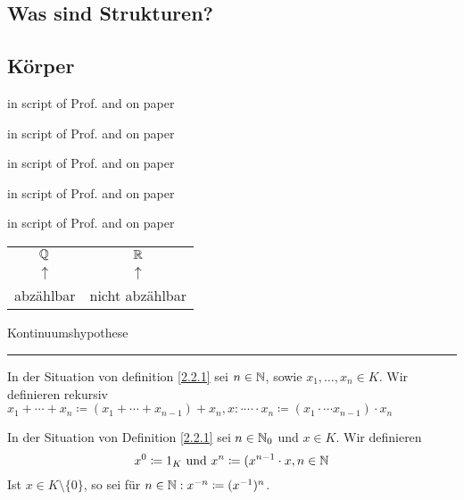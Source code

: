 \documentclass[consecutivenumbering]{gadsescript}
\begin{document}
\subsection{Was sind Strukturen?}
\subsection{Körper}
\begin{subdefinition}[Körper]
	in script of Prof. and on paper
\end{subdefinition}
\begin{subexample}
	in script of Prof. and on paper
\end{subexample}
\begin{subexample}
	in script of Prof. and on paper
\end{subexample}
\begin{sublemma}
	in script of Prof. and on paper
\end{sublemma}
\begin{sublemma}
	in script of Prof. and on paper
\end{sublemma}
\begin{tabular}{cc}
	$\mathbb{Q}$ & $\mathbb{R}$\\
	$\uparrow $ & $\uparrow $\\
	abzählbar & nicht abzählbar\\
\end{tabular}
Kontinuumshypothese
\hrule
\begin{definition}
	In der Situation von definition \ref{2.2.1} sei $ n \in \mathbb{N} $, sowie $ x_1, \dotsc, x_n \in K $. Wir definieren rekursiv $ x_1 + \dotsb + x_n \coloneqq ( x_1 + \dotsb + x_{n-1} ) + x_n, x: \cdot \dotsb \cdot x_n \coloneqq ( x_1 \cdot \dotsb x_{n-1} ) \cdot x_n $
\end{definition}
\begin{definition}
	In der Situation von Definition \ref{2.2.1} sei $ n \in \mathbb{N}_0 $ und $ x \in K $. Wir definieren
	\[ x^0 \coloneqq 1_K \text{ und } x^n \coloneqq ( x^{n-1} \cdot x, n \in \mathbb{N} \]
	Ist $ x \in K\setminus\{0\} $, so sei für $ n \in \mathbb{N} : x^{-n} \coloneqq ( x^{-1})^n $.
\end{definition}
\end{document}
